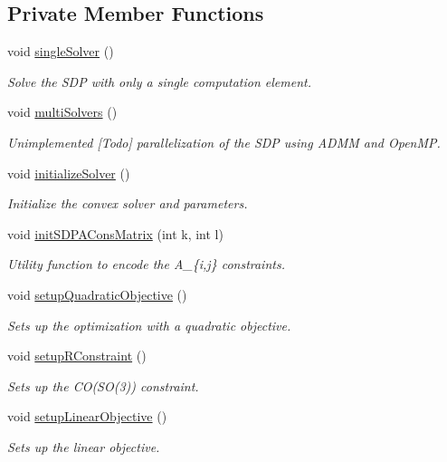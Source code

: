 \subsection*{\-Private \-Member \-Functions}
\begin{DoxyCompactItemize}
\item 
void \hyperlink{classSolvePoseCVX_ac6c5c12f31943c02eac2b4e3afe95cb5}{single\-Solver} ()
\begin{DoxyCompactList}\small\item\em \-Solve the \-S\-D\-P with only a single computation element. \end{DoxyCompactList}\item 
void \hyperlink{classSolvePoseCVX_aa15afe19bca14542c1466f4582a8408a}{multi\-Solvers} ()
\begin{DoxyCompactList}\small\item\em \-Unimplemented \mbox{[}\-Todo\mbox{]} parallelization of the \-S\-D\-P using \-A\-D\-M\-M and \-Open\-M\-P. \end{DoxyCompactList}\item 
void \hyperlink{classSolvePoseCVX_af71375a8ebc356e5794249ae0c1243d6}{initialize\-Solver} ()
\begin{DoxyCompactList}\small\item\em \-Initialize the convex solver and parameters. \end{DoxyCompactList}\item 
void \hyperlink{classSolvePoseCVX_aadfc695ad82f44103e7e51c037ddb232}{init\-S\-D\-P\-A\-Cons\-Matrix} (int k, int l)
\begin{DoxyCompactList}\small\item\em \-Utility function to encode the \-A\-\_\-\{i,j\} constraints. \end{DoxyCompactList}\item 
void \hyperlink{classSolvePoseCVX_ac1b83848a5b98e008dfc9b7a87b0079c}{setup\-Quadratic\-Objective} ()
\begin{DoxyCompactList}\small\item\em \-Sets up the optimization with a quadratic objective. \end{DoxyCompactList}\item 
void \hyperlink{classSolvePoseCVX_a4e1c078bdb3a613349c7136bdb0899b9}{setup\-R\-Constraint} ()
\begin{DoxyCompactList}\small\item\em \-Sets up the \-C\-O(\-S\-O(3)) constraint. \end{DoxyCompactList}\item 
void \hyperlink{classSolvePoseCVX_adba2454a08d9e6115cd075928c1d5518}{setup\-Linear\-Objective} ()
\begin{DoxyCompactList}\small\item\em \-Sets up the linear objective. \end{DoxyCompactList}\end{DoxyCompactItemize}
